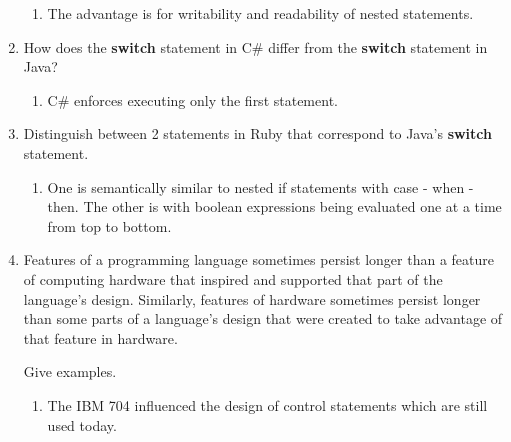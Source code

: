\begin{enumerate}
    \begin{answer}

    \begin{enumerate}
    \item The advantage is for writability and readability of nested statements.
    \end{enumerate}

    \end{answer}
  
  \item How does the \textbf{switch} statement in C\#
    differ from the \textbf{switch} statement in Java?

      \begin{answer}

    \begin{enumerate}
    \item C\# enforces executing only the first statement.
    \end{enumerate}

    \end{answer}

  \item Distinguish between 2 statements in Ruby
    that correspond to Java's \textbf{switch} statement.

      \begin{answer}

    \begin{enumerate}
    \item  One is semantically similar to nested if statements with case - when - then. 
      The other is with boolean expressions being evaluated one at a time from top to bottom.
    \end{enumerate}

    \end{answer}

  \item Features of a programming language sometimes persist
    longer than a feature of computing hardware that inspired
    and supported that part of the language's design.
    Similarly, features of hardware sometimes persist longer
    than some parts of a language's design that were created
    to take advantage of that feature in hardware.

    Give examples.
    \begin{enumerate}
    \item  The IBM 704 influenced the design of control statements which are still used today.
    \end{enumerate}


\end{enumerate}
